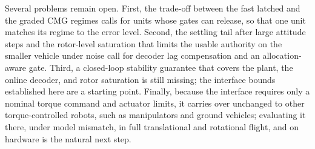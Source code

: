 \documentclass[letterpaper, 10 pt, conference]{ieeeconf}
\begin{document}
Several problems remain open. First, the trade-off between the fast latched and the graded CMG regimes calls for units whose gates can release, so that one unit matches its regime to the error level. Second, the settling tail after large attitude steps and the rotor-level saturation that limits the usable authority on the smaller vehicle under noise call for decoder lag compensation and an allocation-aware gate. Third, a closed-loop stability guarantee that covers the plant, the online decoder, and rotor saturation is still missing; the interface bounds established here are a starting point. Finally, because the interface requires only a nominal torque command and actuator limits, it carries over unchanged to other torque-controlled robots, such as manipulators and ground vehicles; evaluating it there, under model mismatch, in full translational and rotational flight, and on hardware is the natural next step.



\end{document}
